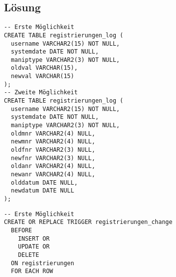 \documentclass[a4paper,10pt,titlepage=false]{scrreprt}
\begin{document}
\begin{itemize}
\subsection{Lösung}
\begin{lstlisting}[style=sql, title=Log-Tabelle]
-- Erste Möglichkeit
CREATE TABLE registrierungen_log (
  username VARCHAR2(15) NOT NULL,
  systemdate DATE NOT NULL,
  maniptype VARCHAR2(3) NOT NULL,
  oldval VARCHAR(15), 
  newval VARCHAR(15)
);
-- Zweite Möglichkeit
CREATE TABLE registrierungen_log (
  username VARCHAR2(15) NOT NULL,
  systemdate DATE NOT NULL,
  maniptype VARCHAR2(3) NOT NULL,
  oldmnr VARCHAR2(4) NULL,
  newmnr VARCHAR2(4) NULL,
  oldfnr VARCHAR2(3) NULL,
  newfnr VARCHAR2(3) NULL,
  oldanr VARCHAR2(4) NULL,
  newanr VARCHAR2(4) NULL,
  olddatum DATE NULL,
  newdatum DATE NULL
);
\end{lstlisting}
\begin{lstlisting}[style=sql, title=Trigger]
-- Erste Möglichkeit
CREATE OR REPLACE TRIGGER registrierungen_change
  BEFORE 
    INSERT OR
    UPDATE OR
    DELETE
  ON registrierungen
  FOR EACH ROW
  

\end{lstlisting}
\end{itemize}
\end{document}
